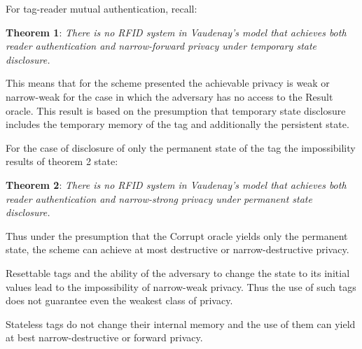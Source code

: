     For tag-reader mutual authentication, recall:

    \textbf{Theorem 1}: \textit{There is no RFID system in Vaudenay's model that achieves both reader authentication and narrow-forward privacy 
    under temporary state disclosure.}

    This means that for the scheme presented the achievable privacy is weak or narrow-weak for the case in which the adversary has no
    access to the Result oracle. This result is based on the presumption that temporary state disclosure includes the temporary
    memory of the tag and additionally the persistent state.

    For the case of disclosure of only the permanent state of the tag the impossibility results of theorem 2 state:

    \textbf{Theorem 2}: \textit{There is no RFID system in Vaudenay's model that achieves both reader authentication and narrow-strong privacy 
    under permanent state disclosure.}

    Thus under the presumption that the Corrupt oracle yields only the permanent state, the scheme can achieve at most destructive or
    narrow-destructive privacy.

    Resettable tags and the ability of the adversary to change the state to its initial values lead to the impossibility of narrow-weak
    privacy. Thus the use of such tags does not guarantee even the weakest class of privacy.

    Stateless tags do not change their internal memory and the use of them can yield at best narrow-destructive or forward privacy.
